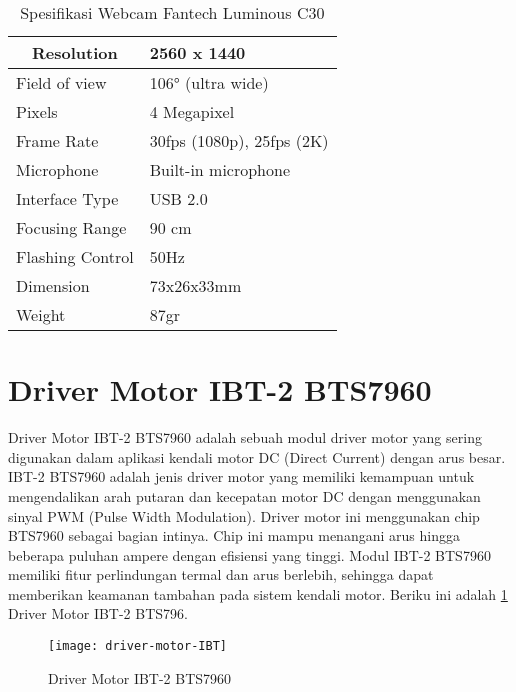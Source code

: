 \begin{table}[H]
	\caption{Spesifikasi Webcam Fantech Luminous C30}
	\label{tab:spesifikasi-webcam}
	\centering
	\begin{tabular}{|l|l|}
		\hline
		\multicolumn{1}{|c|}{Resolution} & 2560 x 1440               \\ \hline
		Field of view                    & 106° (ultra wide)         \\ \hline
		Pixels                           & 4 Megapixel               \\ \hline
		Frame Rate                       & 30fps (1080p), 25fps (2K) \\ \hline
		Microphone                       & Built-in microphone       \\ \hline
		Interface Type                   & USB 2.0                   \\ \hline
		Focusing Range                   & 90 cm                     \\ \hline
		Flashing Control                 & 50Hz                      \\ \hline
		Dimension                        & 73x26x33mm                \\ \hline
		Weight                           & 87gr                      \\ \hline
	\end{tabular}
\end{table}

\section{Driver Motor IBT-2 BTS7960}
Driver Motor IBT-2 BTS7960 adalah sebuah modul driver motor yang sering digunakan dalam aplikasi kendali motor DC (Direct Current) dengan arus besar. IBT-2 BTS7960 adalah jenis driver motor yang memiliki kemampuan untuk mengendalikan arah putaran dan kecepatan motor DC dengan menggunakan sinyal PWM (Pulse Width Modulation).
Driver motor ini menggunakan chip BTS7960 sebagai bagian intinya. Chip ini mampu menangani arus hingga beberapa puluhan ampere dengan efisiensi yang tinggi. Modul IBT-2 BTS7960 memiliki fitur perlindungan termal dan arus berlebih, sehingga dapat memberikan keamanan tambahan pada sistem kendali motor. Beriku ini adalah \cref{fig:driver-motor-ibt} Driver Motor IBT-2 BTS796.

\begin{figure}[H]
	\centering
	\texttt{[image: driver-motor-IBT]}
	\caption{Driver Motor IBT-2 BTS7960}
	\label{fig:driver-motor-ibt}
\end{figure}

